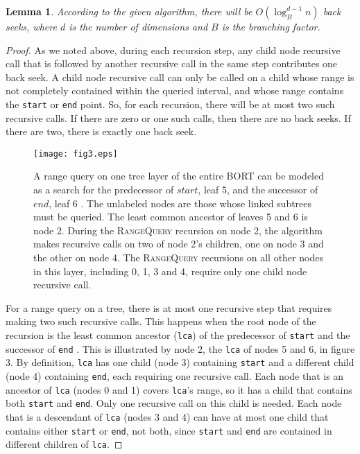 \documentclass[11pt, oneside]{article}
\newcommand{\ms}{\texttt}
\newtheorem*{lemma}{Lemma}
\begin{document}
\begin{lemma}
    According to the given algorithm, there will be $O(\log_B^{d-1}n)$
    back seeks, where $d$ is the number of dimensions and $B$ is the
    branching factor. 
\end{lemma}
\begin{proof}
    As we noted above, during each recursion step, any child node recursive call
    that is followed by another recursive call in the same step contributes one
    back seek. A child node recursive call can only be called on a child
    whose range is not completely contained within the queried interval, and
    whose range contains the \ms{start} or \ms{end} point. So, for each
    recursion, there will be at most two such recursive calls. If there are zero
    or one such calls, then there are no back seeks. If there are two, there is
    exactly one back seek.

    \begin{figure}[h!]
        \centering
        \vspace{0.25in}
        \texttt{[image: fig3.eps]}
        \caption{
            A range query on one tree layer of the entire BORT can be modeled as
            a search for the predecessor of $start$, leaf 5, and the successor
            of $end$, leaf 6 \cite{lecture}. The unlabeled nodes are those
            whose linked subtrees must be queried. The least common ancestor of
            leaves 5 and 6 is node 2. During the \textsc{RangeQuery} recursion
            on node 2, the algorithm makes recursive calls on two of node 2's
            children, one on node 3 and the other on node 4. The
            \textsc{RangeQuery} recursions on all other nodes in this layer,
            including 0, 1, 3 and 4, require only one child node recursive call.
        }
        \vspace{0.25in}
    \end{figure}

    For a range query on a tree, there is at most one recursive step that
    requires making two such recursive calls. This happens when the root node of
    the recursion is the least common ancestor (\ms{lca}) of the predecessor of
    \ms{start} and the successor of \ms{end} \cite{lecture}. This is illustrated
    by node 2, the \ms{lca} of nodes 5 and 6, in figure 3. By definition,
    \ms{lca} has one child (node 3) containing \ms{start} and a different child
    (node 4) containing \ms{end}, each requiring one recursive call. Each node
    that is an ancestor of \ms{lca} (nodes 0 and 1) covers
    \ms{lca}'s range, so it has a child that contains both \ms{start} and
    \ms{end}. Only one recursive call on this child is needed. Each node that is
    a descendant of \ms{lca} (nodes 3 and 4) can have at most one child that
    contains either \ms{start} or \ms{end}, not both, since \ms{start} and
    \ms{end} are contained in different children of \ms{lca}. 


\end{proof}
\end{document}
